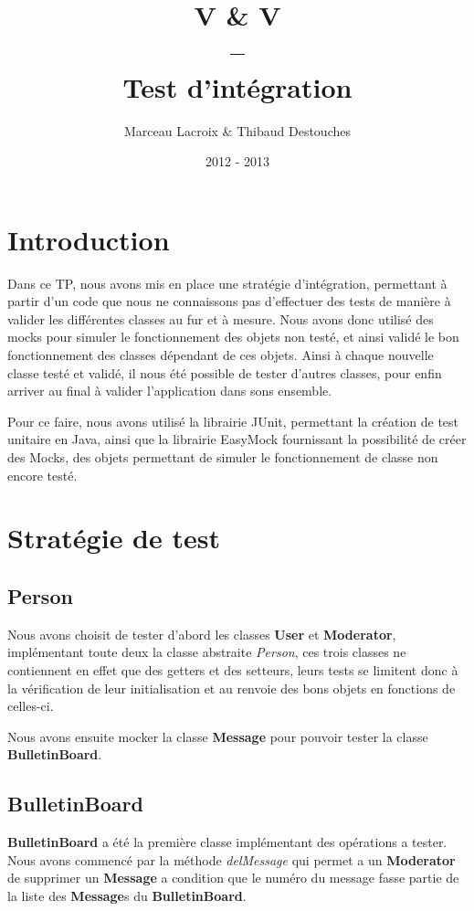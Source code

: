 \documentclass{article}
\title{V \& V
\\
--
\\
Test d'intégration}
\author{Marceau Lacroix \& Thibaud Destouches}
\date{2012 - 2013}
\begin{document}
\begin{titlepage}
\maketitle
\end{titlepage}

\newpage
\section*{Introduction}
Dans ce TP, nous avons mis en place une stratégie d'intégration, permettant à partir d'un code que nous ne connaissons pas d'effectuer des tests de manière à valider les différentes classes au fur et à mesure. Nous avons donc utilisé des mocks pour simuler le fonctionnement des objets non testé, et ainsi validé le bon fonctionnement des classes dépendant de ces objets. Ainsi à chaque nouvelle classe testé et validé, il nous été possible de tester d'autres classes, pour enfin arriver au final à valider l'application dans sons ensemble.

Pour ce faire, nous avons utilisé la librairie JUnit, permettant la création de test unitaire en Java, ainsi que la librairie EasyMock fournissant la possibilité de créer des Mocks, des objets permettant de simuler le fonctionnement de classe non encore testé.

\newpage
\section{Stratégie de test}

\subsection{Person}
Nous avons choisit de tester d'abord les classes \textbf{User} et \textbf{Moderator}, implémentant toute deux la classe abstraite \textit{Person}, ces trois classes ne contiennent en effet que des getters et des setteurs, leurs tests se limitent donc à la vérification de leur initialisation et au renvoie des bons objets en fonctions de celles-ci.

Nous avons ensuite mocker la classe \textbf{Message} pour pouvoir tester la classe \textbf{BulletinBoard}.

\subsection{BulletinBoard}
\textbf{BulletinBoard} a été la première classe implémentant des opérations a tester. Nous avons commencé par la méthode \textit{delMessage} qui permet a un \textbf{Moderator} de supprimer un \textbf{Message} a condition que le numéro du message fasse partie de la liste des \textbf{Message}s du \textbf{BulletinBoard}.
\end{document}
